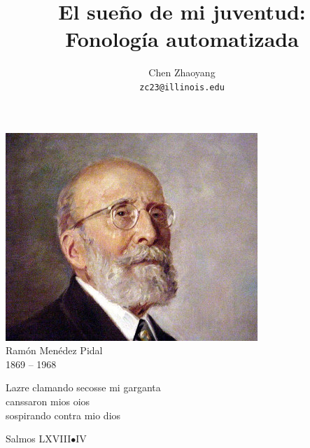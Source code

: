 \documentclass{report}[12pt]
\title{El sueño de mi juventud: \\ Fonología automatizada}
\author{Chen Zhaoyang \\ \texttt{zc23@illinois.edu}}
\begin{document}
\maketitle

\pagebreak

\hspace{0pt}
\vfill

\begin{center}
  \includegraphics[scale=1.25]{pidal.jpg} \\
  \vspace{0.2cm}
  \Huge{Ramón Menédez Pidal \\ 1869 -- 1968}
\end{center}

\vfill  
\hspace{0pt}

\thispagestyle{empty}

\pagebreak

\begin{abstract}
  
\end{abstract}

\pagebreak

\hspace{0pt}
\vfill

\begin{center}
  \begin{flushleft}
    Lazre clamando secosse mi garganta \\
    canssaron mios oios \\
    sospirando contra mio dios \\
  \end{flushleft}
  \vspace{0.5cm}
  \begin{flushright}
    Salmos LXVIII$\bullet$IV\footnotemark
  \end{flushright}
\end{center}
\end{document}
